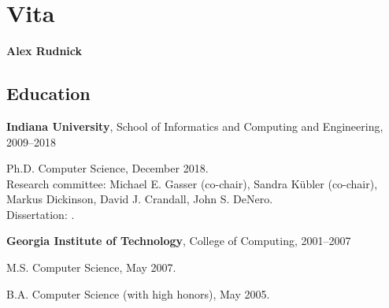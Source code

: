 \chapter*{Vita}


\def\name{Alex Rudnick}

\setlength\parindent{0em}

\pagestyle{empty}

\newcommand{\localtextbulletone}{\textcolor{gray}{\raisebox{.45ex}{\rule{.6ex}{.6ex}}}}
\renewcommand{\labelitemii}{\localtextbulletone}
\renewcommand{\labelitemi}{\localtextbulletone}

\newenvironment{itemize*}
  {\begin{itemize}
      \setlength{\itemsep}{1pt}
      \setlength{\parskip}{3pt}
  }
  {\end{itemize}}

\centerline{\textbf{\name}}

\bigskip
\bigskip

\section*{Education}
\begin{itemize*}
\item
\textbf{Indiana University}, School of Informatics and Computing and
Engineering, 2009--2018
\begin{itemize*}
\item Ph.D. Computer Science, December 2018. \\
      Research committee: Michael E. Gasser (co-chair), Sandra K\"{u}bler
      (co-chair), Markus Dickinson, David J. Crandall, John S. DeNero. \\
      Dissertation: \emph{\thesisTitle}.
\end{itemize*}

\item
\textbf{Georgia Institute of Technology}, College of Computing, 2001--2007
\begin{itemize*}
\item M.S. Computer Science, May 2007.
\item B.A. Computer Science (with high honors), May 2005.
\end{itemize*}
\end{itemize*}

